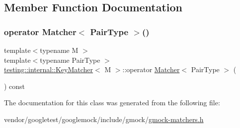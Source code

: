 \subsection{Member Function Documentation}
\mbox{\label{classtesting_1_1internal_1_1_key_matcher_aa3861b06dd9e3255a7c1c013ddf88fb5}} 
\subsubsection{\texorpdfstring{operator Matcher$<$ Pair\+Type $>$()}{operator Matcher< PairType >()}}
{\footnotesize\ttfamily template$<$typename M $>$ \\
template$<$typename Pair\+Type $>$ \\
\hyperlink{classtesting_1_1internal_1_1_key_matcher}{testing\+::internal\+::\+Key\+Matcher}$<$ M $>$\+::operator \hyperlink{classtesting_1_1_matcher}{Matcher}$<$ Pair\+Type $>$ (\begin{DoxyParamCaption}{ }\end{DoxyParamCaption}) const\hspace{0.3cm}{\ttfamily [inline]}}



The documentation for this class was generated from the following file\+:\begin{DoxyCompactItemize}
\item 
vendor/googletest/googlemock/include/gmock/\hyperlink{gmock-matchers_8h}{gmock-\/matchers.\+h}\end{DoxyCompactItemize}
